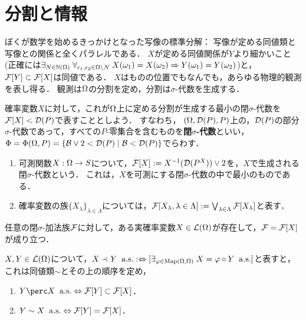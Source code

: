\documentclass[uplatex,dvipdfmx]{jsreport}
\begin{document}
\section{分割と情報}

\begin{tcolorbox}[colframe=ForestGreen, colback=ForestGreen!10!white,breakable,colbacktitle=ForestGreen!40!white,coltitle=black,fonttitle=\bfseries\sffamily,
title=]
    ぼくが数学を始めるきっかけとなった写像の標準分解：
    写像が定める同値類と写像との関係と全くパラレルである．
    $X$が定める同値関係が$Y$より細かいこと(正確には$\exists_{N\in\mathbb{N}(\Omega)}\;\forall_{\epsilon_1,\epsilon_2\in\Omega\setminus N}\;X(\omega_1)=X(\omega_2)\Rightarrow Y(\omega_1)=Y(\omega_2)$)と，$\mathcal{F}[Y]\subset\mathcal{F}[X]$は同値である．
    $X$はものの位置でもなんでも，あらゆる物理的観測を表し得る．
    観測は$\Omega$の分割を定め，分割は$\sigma$-代数を生成する．
\end{tcolorbox}

\begin{notation}
    確率変数$X$に対して，これが$\Omega$上に定める分割が生成する最小の閉$\sigma$-代数を$\mathcal{F}[X]<\mathcal{D}(P)$で表すこととしよう．
    すなわち，
    $(\Omega,\mathcal{D}(P),P)$上の，$\mathcal{D}(P)$の部分$\sigma$-代数であって，すべての$P$-零集合を含むものを\textbf{閉$\sigma$-代数}といい，$\Phi=\Phi(\Omega,P)=\left\{\mathcal{B}\lor2<\mathcal{D}(P)\mid\mathcal{B}<\mathcal{D}(P)\right\}$でらわす．
\end{notation}

\begin{definition}\mbox{}
    \begin{enumerate}
        \item 可測関数$X:\Omega\to S$について，$\mathcal{F}[X]:=X^{-1}(\mathcal{D}(P^X))\lor 2$を，$X$で生成される閉$\sigma$-代数という．
        これは，$X$を可測にする閉$\sigma$-代数の中で最小のものである．
        \item 確率変数の族$\{X_\lambda\}_{\lambda\in\Lambda}$については，$\mathcal{F}[X_\lambda,\lambda\in\Lambda]:=\bigvee_{\lambda\in\Lambda}\mathcal{F}[X_\lambda]$と表す．
    \end{enumerate}
\end{definition}

\begin{theorem}
    任意の閉$\sigma$-加法族$\mathcal{F}$に対して，ある実確率変数$X\in\mathcal{L}(\Omega)$が存在して，$\mathcal{F}=\mathcal{F}[X]$が成り立つ．
\end{theorem}

\begin{theorem}
    $X,Y\in\mathcal{L}(\Omega)$について，$X\prec Y\;\;\mathrm{a.s.}:\Leftrightarrow [\exists_{\varphi\in\mathrm{Map}(\Omega,\Omega)}\;X=\varphi\circ Y\;\;\mathrm{a.s.}]$と表すと，これは同値類$\sim$とその上の順序を定め，
    \begin{enumerate}
        \item $Y\perc X\;\as\Leftrightarrow\F[Y]\subset\F[X]$．
        \item $Y\sim X\;\;\mathrm{a.s.}\Leftrightarrow\mathcal{F}[Y]=\mathcal{F}[X]$．
    \end{enumerate}
\end{theorem}
\end{document}
